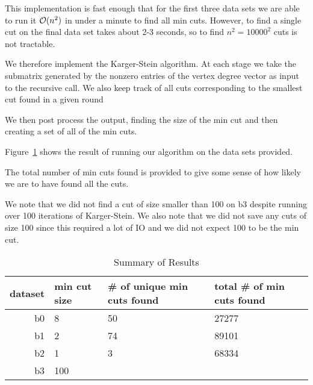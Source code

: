 \documentclass[10pt]{article}
\begin{document}
\begin{solution}[Solution]
This implementation is fast enough that for the first three data sets we are able to run it \( \mathcal{O}(n^2) \) in under a minute to find all min cuts. However, to find a single cut on the final data set takes about 2-3 seconds, so to find \( n^2 = 10000^2 \) cuts is not tractable.

We therefore implement the Karger-Stein algorithm. At each stage we take the submatrix generated by the nonzero entries of the vertex degree vector as input to the recursive call. We also keep track of all cuts corresponding to the smallest cut found in a given round



We then post process the output, finding the size of the min cut and then creating a set of all of the min cuts.




Figure~\ref{results} shows the result of running our algorithm on the data sets provided. 

The total number of min cuts found is provided to give some sense of how likely we are to have found all the cuts.

We note that we did not find a cut of size smaller than 100 on b3 despite running over 100 iterations of Karger-Stein. We also note that we did not save any cuts of size 100 since this required a lot of IO and we did not expect 100 to be the min cut.

\begin{table}\centering
\begin{tabular}{|r||l|l|l|} \hline
    dataset & min cut size & \# of unique min cuts found & total \# of min cuts found \\ \hline
    b0 & 8 & 50 & 27277 \\ \hline
    b1 & 2 & 74 & 89101 \\ \hline
    b2 & 1 & 3 & 68334 \\ \hline
    b3 & 100 & & \\ \hline
\end{tabular}
    \caption{Summary of Results}
    \label{results}
\end{table}



\end{solution}
\end{document}
